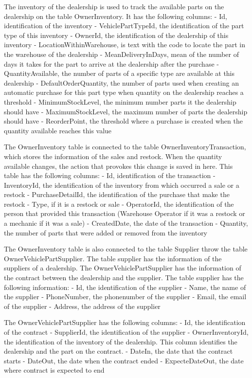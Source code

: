The inventory of the dealership is used to track the available parts on the dealership on the table OwnerInventory.
It has the following columns:
- Id, identification of the inventory
- VehiclePartTypeId, the identification of the part type of this inventory
- OwnerId, the identification of the dealership of this inventory
- LocationWithinWarehouse, is text with the code to locate the part in the warehouse of the dealership
- MeanDeliveryInDays, mean of the number of days it takes for the part to arrive at the dealership after the purchase
- QuantityAvailable, the number of parts of a specific type are available at this dealership
- DefaultOrderQuantity, the number of parts used when creating an automatic purchase for this part type when quantity on the dealership reaches a threshold
- MinimumStockLevel, the minimum number parts it the dealership should have
- MaximumStockLevel, the maximum number of parts the dealership should have
- ReorderPoint, the threshold where a purchase is created when the quantity available reaches this value

The OwnerInventory table is connected to the table OwnerInventoryTransaction, which stores the information of the sales and restock. When the quantity available changes, the action that provokes this change is saved in here.
This table has the following columns:
- Id, identification of the transaction
- InventoryId, the identification of the inventory from which occurred a sale or a restock
- PurchaseDetailId, the identification of the purchase that make the restock
- Type, if it is a restock or sale
- OperatorId, the identification of the person that provided this transaction (Warehouse Operator if it was a restock or a mechanic if it was a sale)
- CreatedDate, the date of the transaction
- Quantity, the number of parts that were added or removed from the inventory

The OwnerInventory table is also connected to the table Supplier throw the table OwnerVehiclePartSupplier.
The table supplier has the information of the suppliers of a dealership. The OwnerVehiclePartSupplier has the information of the contract between the dealership and the supplier. 
The table supplier has the following information:
- Id, the identification of the supplier
- Name, the name of the supplier
- PhoneNumber, the phonenumber of the supplier 
- Email, the email of the supplier
- Address, the address of the supplier

The OwnerVehiclePartSupplier has the following columns:
- Id, the identification of the contract
- SupplierId, the identification of the supplier
- OwnerInventoryId, the identification of the inventory of the dealership. This column identifies the dealership and the part on the contract.
- DateIn, the date that the contract starts
- DateOut, the date when the contract ended
- ExpecteDateOut, the date where contract is expected to end

